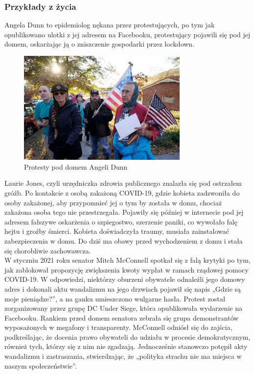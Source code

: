\subsubsection{Przykłady z życia}
Angela Dunn to epidemiolog nękana przez protestujących, po tym jak opublikowano ulotki z jej adresem na Facebooku, protestujący pojawili się pod jej domem, oskarżając ją o zniszczenie gospodarki przez lockdown. 

\begin{figure}[H]
  \centering
  \includegraphics[width=0.75\textwidth]{images/lockdown.jpg}
  \caption{Protesty pod domem Angeli Dunn}
  \label{fig:lockdown}
\end{figure} 

Laurie Jones, czyli  urzędniczka zdrowia publicznego znalazła się pod ostrzałem gróźb. Po kontakcie z osobą zakażoną COVID-19, gdzie kobieta zadzwoniła do osoby zakażonej, aby przypomnieć jej o tym by została w domu, chociaż zakażona osoba tego nie przestrzegała. Pojawiły się później w internecie pod jej adresem fałszywe oskarżenia o szpiegostwo, szerzenie paniki, co wywołało falę hejtu i groźby śmierci.
Kobieta doświadczyła traumy, musiała zainstalować zabezpieczenia w domu. Do dziś ma obawy przed wychodzeniem z domu i stała się chorobliwie zachowawcza.\\

W styczniu 2021 roku senator Mitch McConnell spotkał się z falą krytyki po tym, jak zablokował propozycję zwiększenia kwoty wypłat w ramach rządowej pomocy COVID-19. W odpowiedzi, niektórzy oburzeni obywatele odnaleźli jego domowy adres i dokonali aktu wandalizmu na jego drzwiach pojawił się napis „Gdzie są moje pieniądze?”, a na ganku umieszczono wulgarne hasła.
Protest został zorganizowany przez grupę DC Under Siege, która opublikowała wydarzenie na Facebooku. Rankiem przed domem senatora zebrała się grupa demonstrantów wyposażonych w megafony i transparenty.
McConnell odniósł się do zajścia, podkreślając, że docenia prawo obywateli do udziału w procesie demokratycznym, również tych, którzy się z nim nie zgadzają. Jednocześnie stanowczo potępił akty wandalizmu i zastraszania, stwierdzając, że „polityka strachu nie ma miejsca w naszym społeczeństwie”.

